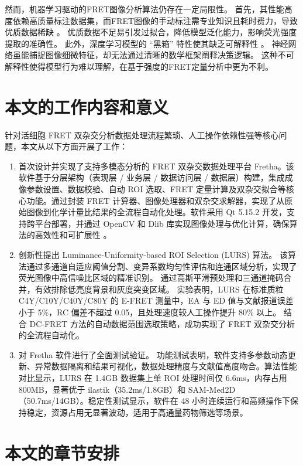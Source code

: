 然而，机器学习驱动的FRET图像分析算法仍存在一定局限性。
首先，其性能高度依赖高质量标注数据集，而FRET图像的手动标注需专业知识且耗时费力，导致优质数据稀缺 。
优质数据不足易引发过拟合，降低模型泛化能力，影响荧光强度提取的准确性。
此外，深度学习模型的 “黑箱” 特性使其缺乏可解释性 。
神经网络虽能捕捉图像细微特征，却无法通过清晰的数学框架阐释决策逻辑。
这种不可解释性使得模型行为难以理解，在基于强度的FRET定量分析中更为不利。
\fi

\section{本文的工作内容和意义}

\ifshowtext
针对活细胞 FRET 双杂交分析数据处理流程繁琐、人工操作依赖性强等核心问题，本文从以下方面开展了工作：
\begin{enumerate}
  \item 首次设计并实现了支持多模态分析的 FRET 双杂交数据处理平台 Fretha。该软件基于分层架构（表现层 / 业务层 / 数据访问层 / 数据层）构建，集成成像参数设置、数据校验、自动 ROI 选取、FRET 定量计算及双杂交拟合等核心功能。通过封装 FRET 计算器、图像处理器和双杂交求解器，实现了从原始图像到化学计量比结果的全流程自动化处理。软件采用 Qt 5.15.2 开发，支持跨平台部署，并通过 OpenCV 和 Dlib 库实现图像处理与优化计算，确保算法的高效性和可扩展性 。
  \item 创新性提出 Luminance-Uniformity-based ROI Selection (LURS) 算法。
  该算法通过多通道自适应阈值分割、变异系数均匀性评估和连通区域分析，实现了荧光图像中高信噪比区域的精准识别。
  通过高斯平滑预处理和三通道掩码合并，有效排除低亮度背景和灰度突变区域。
  实验表明，LURS 在标准质粒 C4Y/C10Y/C40Y/C80Y 的 E-FRET 测量中，EA 与 ED 值与文献报道误差小于 5\%，RC 偏差不超过 0.05，且处理速度较人工操作提升 80\% 以上。
  结合 DC-FRET 方法的自动数据范围选取策略，成功实现了 FRET 双杂交分析的全流程自动化。
  \item 对 Fretha 软件进行了全面测试验证。
  功能测试表明，软件支持多参数动态更新、异常数据隔离和结果可视化，数据处理精度与文献值高度吻合。算法性能对比显示，LURS 在 1.4GB 数据集上单 ROI 处理时间仅 6.6ms，内存占用 800MB，显著优于 ilastik（35.2ms/1.8GB）和 SAM-Med2D（50.7ms/14GB）。稳定性测试显示，软件在 48 小时连续运行和高频操作下保持稳定，资源占用无显著波动，适用于高通量药物筛选等场景。
\end{enumerate}
\fi

\section{本文的章节安排}

